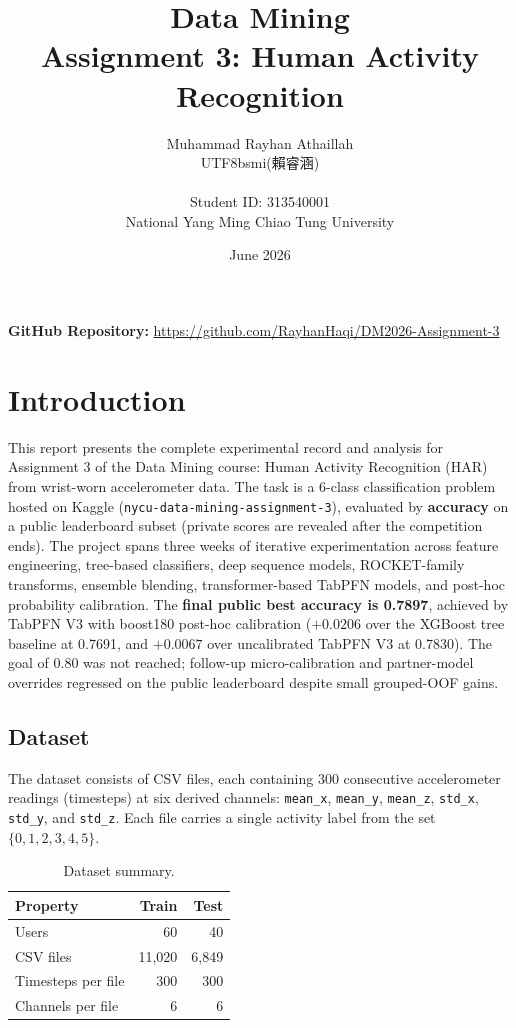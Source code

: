 \documentclass[12pt, a4paper]{article}
\title{\textbf{Data Mining}\\ \large Assignment 3: Human Activity Recognition}
\author{
    Muhammad Rayhan Athaillah \begin{CJK*}{UTF8}{bsmi}(賴睿涵)\end{CJK*}\\
    \small Student ID: 313540001\\
    \small National Yang Ming Chiao Tung University
}
\date{June 2026}
\begin{document}
\maketitle

\vspace{0.5cm}
\noindent \textbf{GitHub Repository:} \href{https://github.com/RayhanHaqi/DM2026-Assignment-3}{https://github.com/RayhanHaqi/DM2026-Assignment-3}

\section{Introduction}

This report presents the complete experimental record and analysis for Assignment 3 of the Data Mining course: Human Activity Recognition (HAR) from wrist-worn accelerometer data. The task is a 6-class classification problem hosted on Kaggle (\texttt{nycu-data-mining-assignment-3}), evaluated by \textbf{accuracy} on a public leaderboard subset (private scores are revealed after the competition ends). The project spans three weeks of iterative experimentation across feature engineering, tree-based classifiers, deep sequence models, ROCKET-family transforms, ensemble blending, transformer-based TabPFN models, and post-hoc probability calibration. The \textbf{final public best accuracy is 0.7897}, achieved by TabPFN V3 with boost180 post-hoc calibration ($+0.0206$ over the XGBoost tree baseline at 0.7691, and $+0.0067$ over uncalibrated TabPFN V3 at 0.7830). The goal of 0.80 was not reached; follow-up micro-calibration and partner-model overrides regressed on the public leaderboard despite small grouped-OOF gains.

\subsection{Dataset}

The dataset consists of CSV files, each containing 300 consecutive accelerometer readings (timesteps) at six derived channels: \texttt{mean\_x}, \texttt{mean\_y}, \texttt{mean\_z}, \texttt{std\_x}, \texttt{std\_y}, and \texttt{std\_z}. Each file carries a single activity label from the set $\{0, 1, 2, 3, 4, 5\}$.

\begin{table}[h]
\centering
\caption{Dataset summary.}
\label{tab:dataset}
\begin{tabular}{@{}lrr@{}}
\toprule
\textbf{Property} & \textbf{Train} & \textbf{Test} \\ \midrule
Users & 60 & 40 \\
CSV files & 11{,}020 & 6{,}849 \\
Timesteps per file & 300 & 300 \\
Channels per file & 6 & 6 \\ \bottomrule
\end{tabular}
\end{table}
\end{document}

